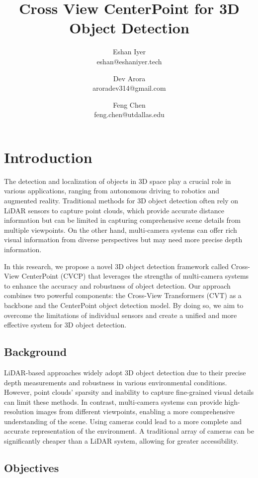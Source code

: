 \documentclass[twocolumn, times]{article}
\title{\textbf{Cross View CenterPoint for 3D Object Detection}}
\author{Eshan Iyer \\ eshan@eshaniyer.tech  \and Dev Arora \\ aroradev314@gmail.com \and Feng Chen \\feng.chen@utdallas.edu }
\date{}
\begin{document}
\maketitle


\section{Introduction}

The detection and localization of objects in 3D space play a crucial role in various applications, ranging from autonomous driving to robotics and augmented reality. Traditional methods for 3D object detection often rely on LiDAR sensors to capture point clouds, which provide accurate distance information but can be limited in capturing comprehensive scene details from multiple viewpoints. On the other hand, multi-camera systems can offer rich visual information from diverse perspectives but may need more precise depth information.

In this research, we propose a novel 3D object detection framework called Cross-View CenterPoint (CVCP) that leverages the strengths of multi-camera systems to enhance the accuracy and robustness of object detection. Our approach combines two powerful components: the Cross-View Transformers (CVT) as a backbone and the CenterPoint object detection model. By doing so, we aim to overcome the limitations of individual sensors and create a unified and more effective system for 3D object detection.

\subsection{Background}

LiDAR-based approaches widely adopt 3D object detection due to their precise depth measurements and robustness in various environmental conditions. However, point clouds' sparsity and inability to capture fine-grained visual details can limit these methods. In contrast, multi-camera systems can provide high-resolution images from different viewpoints, enabling a more comprehensive understanding of the scene. Using cameras could lead to a more complete and accurate representation of the environment. A traditional array of cameras can be significantly cheaper than a LiDAR system, allowing for greater accessibility.

\subsection{Objectives}
\end{document}
